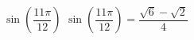 {$\sin\left(\dfrac{11\pi}{12}\right)$}
{$\sin\left(\dfrac{11\pi}{12}\right) = \dfrac{\sqrt{6} - \sqrt{2}}{4}$}

